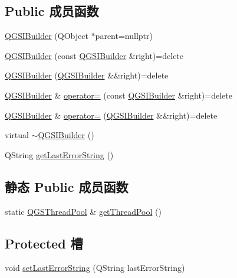\subsection*{Public 成员函数}
\begin{DoxyCompactItemize}
\item 
\mbox{\hyperlink{class_q_g_s_i_builder_ad57c5cb91a85051a4aafb228e1c1f572}{Q\+G\+S\+I\+Builder}} (Q\+Object $\ast$parent=nullptr)
\item 
\mbox{\hyperlink{class_q_g_s_i_builder_a9d7cb4aa8b741aa460a6c7f3daca3385}{Q\+G\+S\+I\+Builder}} (const \mbox{\hyperlink{class_q_g_s_i_builder}{Q\+G\+S\+I\+Builder}} \&right)=delete
\item 
\mbox{\hyperlink{class_q_g_s_i_builder_a41746b6265af2e362fda407909bb87a3}{Q\+G\+S\+I\+Builder}} (\mbox{\hyperlink{class_q_g_s_i_builder}{Q\+G\+S\+I\+Builder}} \&\&right)=delete
\item 
\mbox{\hyperlink{class_q_g_s_i_builder}{Q\+G\+S\+I\+Builder}} \& \mbox{\hyperlink{class_q_g_s_i_builder_afcf032510d95419640059ca926e0fcdb}{operator=}} (const \mbox{\hyperlink{class_q_g_s_i_builder}{Q\+G\+S\+I\+Builder}} \&right)=delete
\item 
\mbox{\hyperlink{class_q_g_s_i_builder}{Q\+G\+S\+I\+Builder}} \& \mbox{\hyperlink{class_q_g_s_i_builder_aeda0f19abf12d6978d1f0c31f1e2d9ec}{operator=}} (\mbox{\hyperlink{class_q_g_s_i_builder}{Q\+G\+S\+I\+Builder}} \&\&right)=delete
\item 
virtual \mbox{\hyperlink{class_q_g_s_i_builder_a3829ba388a3631eacb7c7e463951e188}{$\sim$\+Q\+G\+S\+I\+Builder}} ()
\item 
Q\+String \mbox{\hyperlink{class_q_g_s_i_builder_ad6b8a698803460fc24a565bf090f0b74}{get\+Last\+Error\+String}} ()
\end{DoxyCompactItemize}
\subsection*{静态 Public 成员函数}
\begin{DoxyCompactItemize}
\item 
static \mbox{\hyperlink{class_q_g_s_thread_pool}{Q\+G\+S\+Thread\+Pool}} \& \mbox{\hyperlink{class_q_g_s_i_builder_acbd6b48827bfde420151366b4e74be5c}{get\+Thread\+Pool}} ()
\end{DoxyCompactItemize}
\subsection*{Protected 槽}
\begin{DoxyCompactItemize}
\item 
void \mbox{\hyperlink{class_q_g_s_i_builder_aaef90ccaf1d131ec8afd6ff722996f8b}{set\+Last\+Error\+String}} (Q\+String last\+Error\+String)
\end{DoxyCompactItemize}
